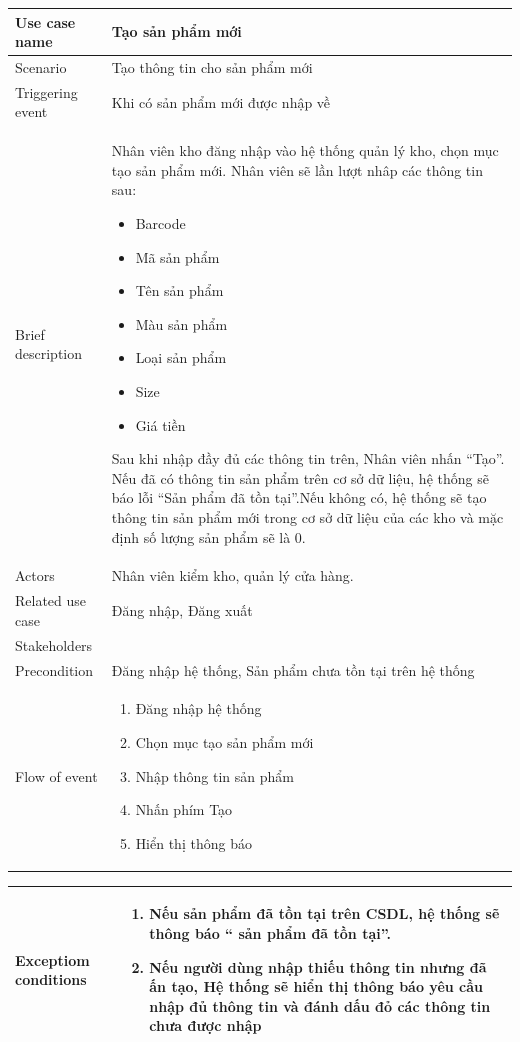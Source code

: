 \documentclass{article}
\begin{document}
\begin{tabular}{|m{4cm}|m{12cm}|}
		\hline
		Use case name & Tạo sản phẩm mới  \\
		\hline
		Scenario & Tạo thông tin cho sản phẩm mới\\
		\hline
		Triggering event & Khi có sản phẩm mới được nhập về\\
		\hline
		Brief description & Nhân viên kho đăng nhập vào hệ thống quản lý kho, chọn mục tạo sản phẩm mới. Nhân viên sẽ lần lượt nhâp các thông tin sau:
		\begin{itemize}
			\item Barcode
			\item Mã sản phẩm
			\item Tên sản phẩm 
			\item Màu sản phẩm
			\item Loại sản phẩm
			\item Size
			\item Giá tiền
		\end{itemize}
		Sau khi nhập đầy đủ các thông tin trên, Nhân viên nhấn “Tạo”. Nếu đã có thông tin sản phẩm trên cơ sở dữ liệu, hệ thống sẽ báo lỗi “Sản phẩm đã tồn tại”.Nếu không có,
hệ thống sẽ tạo thông tin sản phẩm mới trong cơ sở dữ liệu của các kho và mặc định số lượng sản phẩm sẽ là 0.\\
		\hline
		 Actors & Nhân viên kiểm kho, quản lý cửa hàng.\\
		\hline
		Related use case & Đăng nhập, Đăng xuất \\
		\hline
		Stakeholders & \\
		\hline
		Precondition & Đăng nhập hệ thống, Sản phẩm chưa tồn tại trên hệ thống \\
		\hline
		Flow of event & 
			\begin{enumerate}
				\item Đăng nhập hệ thống 
				\item Chọn mục tạo sản phẩm mới
				\item Nhập thông tin sản phẩm
				\item Nhấn phím Tạo
				\item Hiển thị thông báo
			\end{enumerate}\\
		\hline
    \end{tabular}
    
    \begin{tabular}{|m{4cm}|m{12cm}|}
        \hline
        Exceptiom conditions & \begin{enumerate}
            \item Nếu sản phẩm đã tồn tại trên CSDL, hệ thống sẽ thông báo “ sản phẩm đã tồn tại”.
		    \item	Nếu người dùng nhập thiếu thông tin nhưng đã ấn tạo, Hệ thống sẽ hiển thị thông báo yêu cầu nhập đủ thông tin và đánh dấu đỏ các thông tin chưa được nhập
        \end{enumerate}	\\
		\hline
	\end{tabular}
\pagebreak
\end{document}

